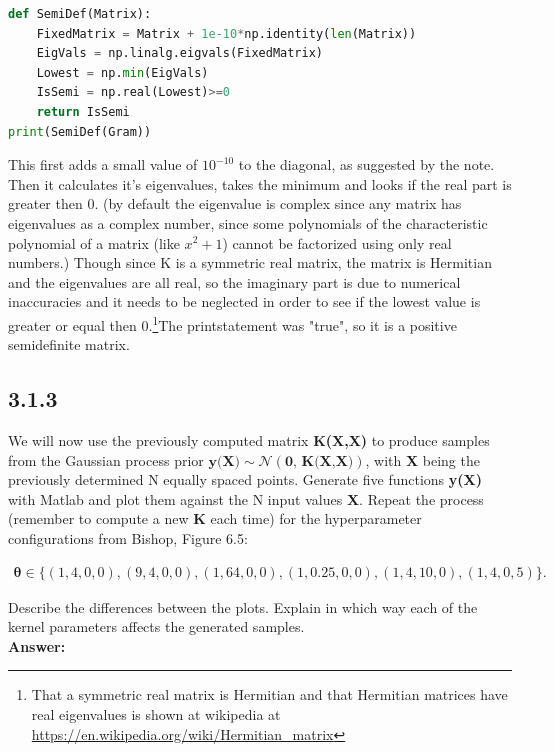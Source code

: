 \documentclass[a4paper]{article}
\begin{document}
\begin{lstlisting}[language=Python]
def SemiDef(Matrix):
    FixedMatrix = Matrix + 1e-10*np.identity(len(Matrix))
    EigVals = np.linalg.eigvals(FixedMatrix)
    Lowest = np.min(EigVals)
    IsSemi = np.real(Lowest)>=0
    return IsSemi
print(SemiDef(Gram))
\end{lstlisting}

This first adds a small value of $10^{-10}$ to the diagonal, as suggested by the note. Then it calculates it's eigenvalues, takes the minimum and looks if the real part is greater then 0. (by default the eigenvalue is complex since any matrix has eigenvalues as a complex number, since some polynomials of the characteristic polynomial of a matrix (like $x^2+1$) cannot be factorized using only real numbers.) Though since K is a symmetric real matrix, the matrix is Hermitian and the eigenvalues are all real, so the imaginary part is due to numerical inaccuracies and it needs to be neglected in order to see if the lowest value is greater or equal then 0.\footnote{That a symmetric real matrix is Hermitian and that Hermitian matrices have real eigenvalues is shown at wikipedia at \url{https://en.wikipedia.org/wiki/Hermitian_matrix}}The printstatement was "true", so it is a positive semidefinite matrix.




\subsection*{3.1.3}

We  will now use the previously computed matrix \textbf{K(X,X)} to produce samples from the Gaussian process prior $\textbf{y(X)} \sim  \mathcal{N}(\textbf{0, K(X,X)})$, with \textbf{X} being the previously determined N equally spaced points. Generate five functions \textbf{y(X)} with Matlab and plot them against the N input values \textbf{X}. Repeat the process (remember to compute a new \textbf{K} each time) for the hyperparameter configurations from Bishop, Figure 6.5:

\begin{align*}
\boldsymbol{\theta} \in \{(1,4,0,0),(9,4,0,0),(1,64,0,0),(1,0.25,0,0),(1,4,10,0),(1,4,0,5)\}.
\end{align*}

Describe the differences between the plots. Explain in which way each of the kernel parameters affects the generated samples.\\


\textbf{Answer:}\\
\end{document}
